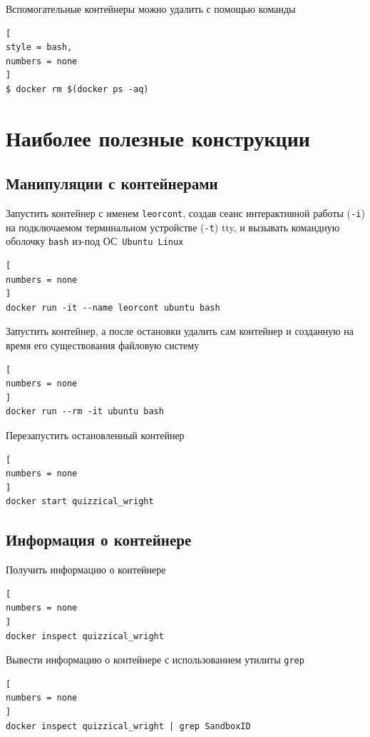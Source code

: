 \documentclass[%
	11pt,
	a4paper,
	utf8,
		]{article}
\begin{document}
Вспомогательные контейнеры можно удалить с помощью команды
\begin{lstlisting}[
style = bash,
numbers = none
]
$ docker rm $(docker ps -aq)
\end{lstlisting}


\section{Наиболее полезные конструкции}

\subsection{Манипуляции с контейнерами}

Запустить контейнер с именем \texttt{leorcont}, создав сеанс интерактивной работы (\texttt{-i}) на подключаемом терминальном устройстве (\texttt{-t}) tty, и вызывать командную оболочку \texttt{bash} из-под ОС~\texttt{Ubuntu Linux}

\begin{lstlisting}[
numbers = none
]
docker run -it --name leorcont ubuntu bash
\end{lstlisting}

Запустить контейнер, а после остановки удалить сам контейнер и созданную на время его существования файловую систему

\begin{lstlisting}[
numbers = none
]
docker run --rm -it ubuntu bash
\end{lstlisting}

Перезапустить остановленный контейнер

\begin{lstlisting}[
numbers = none
]
docker start quizzical_wright
\end{lstlisting}

\subsection{Информация о контейнере}

Получить информацию о контейнере

\begin{lstlisting}[
numbers = none
]
docker inspect quizzical_wright
\end{lstlisting}

Вывести информацию о контейнере с использованием утилиты \texttt{grep}

\begin{lstlisting}[
numbers = none
]
docker inspect quizzical_wright | grep SandboxID
\end{lstlisting}
\end{document}

